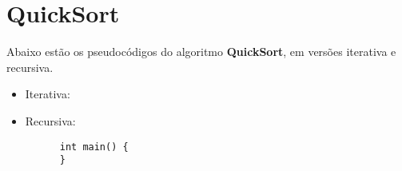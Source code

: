 \section{QuickSort}
Abaixo estão os pseudocódigos do algoritmo \textbf{QuickSort}, em versões iterativa e recursiva.
\begin{itemize}
  \item Iterativa:
  \item Recursiva:
    \begin{verbatim}
      int main() { 
      }
    \end{verbatim}
\end{itemize}
